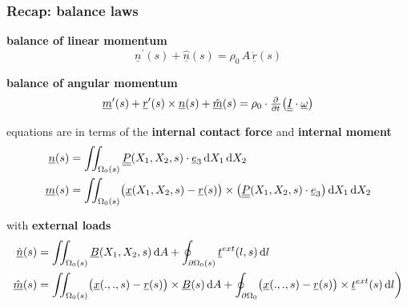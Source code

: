 \begin{frame}
  \frametitle{Recap: balance laws}

  \textbf{balance of linear momentum}
  \begin{displaymath}
    \underline{n}^{\prime}(s) + \underline{\hat{n}}(s) =
    \rho_0 \, A \, \underline{\ddot{r}}(s)
  \end{displaymath}
  
  \vspace{0.5em}
  \textbf{balance of angular momentum}
  \begin{displaymath}
    \underline{m}^{\prime}(s) + \underline{r}^{\prime}(s) \times \underline{n}(s) + \underline{\hat{m}}(s) =
    \rho_0 \cdot
    \pd{}{t} \bigl( \doubleunderline{I} \cdot \underline{\omega} \bigr)
  \end{displaymath}
  
  \vspace{0.5em}
  equations are in terms of the \textbf{internal contact force} and \textbf{internal moment}
  \begin{displaymath}
    \begin{alignedat}{1}
      \underline{n}(s) &= \iint_{\Omega_0(s)} \doubleunderline{P}(X_1, X_2, s) \cdot \underline{e}_3 \dif X_1 \dif X_2 \\
      \underline{m}(s) &= \iint_{\Omega_0(s)} \bigl( \underline{x}(X_1,X_2,s) - \underline{r}(s) \bigr) \times \bigl( \doubleunderline{P}(X_1,X_2,s) \cdot \underline{e}_3 \bigr) \dif X_1 \dif X_2 %
    \end{alignedat}
  \end{displaymath}
  
  \vspace{0.5em}
  with \textbf{external loads}
  \begin{displaymath}
    \begin{alignedat}{1}
      \underline{\hat{n}}(s) &= \iint_{\Omega_{0}(s)} \underline{B}(X_1,X_2,s) \dif A + \oint_{\partial \Omega_{0}(s)} \underline{t}^{ext}(l,s) \dif l \\
      \underline{\hat{m}}(s) &= \iint_{\Omega_{0}(s)} \bigl( \underline{x}(.,.,s) - \underline{r}(s) \bigr) \times \underline{B}(s) \dif A + \oint_{\partial \Omega_0} \bigl( \underline{x}(.,.,s) - \underline{r}(s) \bigr) \times \underline{t}^{ext}(s) \dif l \biggr)
    \end{alignedat}
  \end{displaymath}
  
\end{frame}


